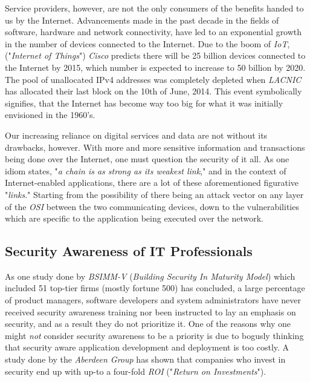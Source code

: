 \documentclass[a4paper,12pt]{article}
\begin{document}
	Service providers, however, are not the only consumers of the benefits handed to us by the Internet. Advancements made in the past decade in the fields of software, hardware and network connectivity, have led to an exponential growth in the number of devices connected to the Internet. Due to the boom of \textit{IoT}, ("\textit{Internet of Things}") \textit{Cisco} predicts there will be 25 billion devices connected to the Internet by 2015, which number is expected to increase to 50 billion by 2020.\cite{devans11} The pool of unallocated IPv4 addresses was completely depleted when \textit{LACNIC} has allocated their last block on the 10th of June, 2014.\cite{ghouston11} This event symbolically signifies, that the Internet has become way too big for what it was initially envisioned in the 1960's.
	
	Our increasing reliance on digital services and data are not without its drawbacks, however. With more and more sensitive information and transactions being done over the Internet, one must question the security of it all. As one idiom states, "\textit{a chain is as strong as its weakest link}," and in the context of Internet-enabled applications, there are a lot of these aforementioned figurative "\textit{links}." Starting from the possibility of there being an attack vector on any layer of the \textit{OSI} between the two communicating devices, down to the vulnerabilities which are specific to the application being executed over the network.
	
\subsection{Security Awareness of IT Professionals}
	
	As one study done by \textit{BSIMM-V} (\textit{Building Security In Maturity Model}) which included 51 top-tier firms (mostly fortune 500) has concluded\cite{gmcgraw12}, a large percentage of product managers, software developers and system administrators have never received security awareness training nor been instructed to lay an emphasis on security, and as a result they do not prioritize it. One of the reasons why one might \textit{not} consider security awareness to be a priority is due to bogusly thinking that security aware application development and deployment is too costly. A study done by the \textit{Aberdeen Group} has shown that companies who invest in security end up with up-to a four-fold \textit{ROI} ("\textit{Return on Investments}").\cite{aberdeen11}
	
\end{document}
